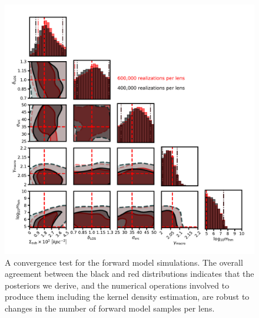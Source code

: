 \begin{figure}
	\includegraphics[clip,trim=2cm 0cm 1cm
	0cm,width=.9\textwidth,keepaspectratio]{./figures_LOSforward/convergence_test.pdf}
	\caption{\label{fig:convergence_test} A convergence test for the forward model simulations. The overall agreement between the black and red distributions indicates that the posteriors we derive, and the numerical operations involved to produce them including the kernel density estimation, are robust to changes in the number of forward model samples per lens.}
\end{figure}

